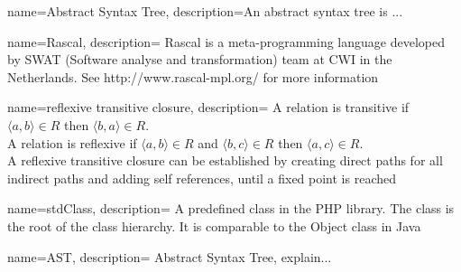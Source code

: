 \documentclass[main.tex]{subfiles}
\begin{document}
    {
        name=Abstract Syntax Tree,
        description={An abstract syntax tree is ...}
    }
    
    {
        name=Rascal,
        description={
            Rascal is a meta-programming language developed by SWAT (Software analyse and transformation) team at CWI in the Netherlands}.
            See http://www.rascal-mpl.org/ for more information
    }
    
    {
        name=reflexive transitive closure,
        description={
            A relation is transitive if $\langle a,b \rangle \in R$ then $\langle b,a \rangle \in R$. \\
            A relation is reflexive if $\langle a,b \rangle \in R$ and $\langle b,c \rangle \in R$ then $\langle a,c \rangle \in R$. \\
            A reflexive transitive closure can be established by creating direct paths for all indirect paths and adding self references, until a fixed point is reached}
    }
    
    {
        name=stdClass,
        description={
            A predefined class in the PHP library. The class is the root of the class hierarchy. 
            It is comparable to the Object class in Java}
    }
    
    {
        name=AST,
        description={
            Abstract Syntax Tree, explain...
        }
    }
\end{document}
